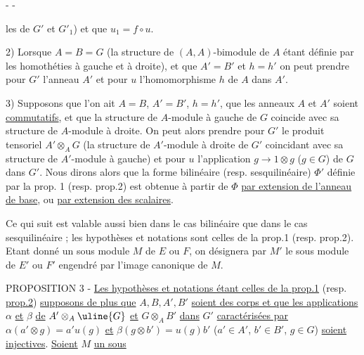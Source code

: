 -  -

les de $G'$ et $G'_1$) et que $u_1=f\circ u$.

2) Lorsque $A=B=G$ (la structure de $(A,A)$-bimodule de $A$ étant définie par les homothéties à gauche et à droite), et que $A'=B'$ et $h=h'$ on peut prendre pour $G'$ l'anneau $A'$ et pour $u$ l'homomorphisme $h$ de $A$ dans $A'$.

3) Supposons que l'on ait $A=B$, $A'=B'$, $h=h'$, que les anneaux $A$ et $A'$ soient \uline{commutatifs}, et que la structure de $A$-module à gauche de $G$ coincide avec sa structure de $A$-module à droite. On peut alors prendre pour $G'$ le produit tensoriel $A'\otimes_A G$ (la structure de $A'$-module à droite de $G'$ coincidant avec sa structure de $A'$-module à gauche) et pour $u$ l'application $g\to1\otimes g$ ($g\in G$) de $G$ dans $G'$. Nous dirons alors que la forme bilinéaire (resp. sesquilinéaire) $\Phi'$ définie par la prop. 1 (resp. prop.2) est obtenue à partir de $\Phi$ \uline{par extension de l'anneau de base}, ou \uline{par extension des scalaires}.

Ce qui suit est valable aussi bien dans le cas bilinéaire que dans le cas sesquilinéaire ; les hypothèses et notations sont celles de la prop.1 (resp. prop.2). Etant donné un sous module $M$ de $E$ ou $F$, on désignera par $M'$ le sous module de $E'$ ou $F'$ engendré par l'image canonique de $M$.

PROPOSITION 3 - \uline{Les hypothèses et notations étant celles de la prop.1} (resp. \uline{prop.2}) \uline{supposons de plus que} $A,B,A',B'$ \uline{soient des corps et que les applications} $\alpha$ \uline{et} $\beta$ \uline{de} $A'\otimes_A \uline{G}$ \uline{et} $G\otimes_A B'$ \uline{dans} $G'$ \uline{caractérisées par} $\alpha(a'\otimes g)=a'u(g)$ \uline{et} $\beta(g\otimes b')=u(g)b'$ ($a'\in A'$, $b'\in B'$, $g\in G$) \uline{soient injectives}. \uline{Soient} $M$ \uline{un sous}
